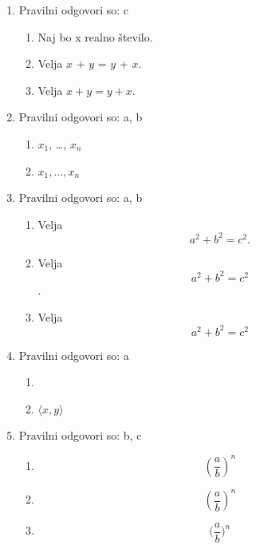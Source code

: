 \documentclass[11pt]{article}
\begin{document}
\begin{enumerate}
    \item Pravilni odgovori so: c%
    \begin{enumerate}
        \item Naj bo x realno število.
        \item Velja \(x\) + \(y\) = \(y\) + \(x\).
        \item Velja \(x + y = y + x\).
    \end{enumerate}

    \item Pravilni odgovori so:  a, b%
    \begin{enumerate}
        \item \(x_1\), \dots, \(x_n\)
        \item \(x_1, \ldots, x_n\)
    \end{enumerate}

    \item Pravilni odgovori so: a, b%
    \begin{enumerate}
        \item
Velja
\[
  a^2 + b^2 = c^2.
\]
        \item
Velja
\[
  a^2 + b^2 = c^2
\]
.
        \item
Velja
\[
  a^2 + b^2 = c^2
\]
    \end{enumerate}

    \item Pravilni odgovori so: a%
    \begin{enumerate}
        \item \(<x, y>\)
        \item \(\langle x, y \rangle\)
    \end{enumerate}

    \item Pravilni odgovori so: b, c %
    \begin{enumerate}
        \item \[ (\frac{a}{b})^n \]
        \item \[ \left(\frac{a}{b}\right)^n \]
        \item \[ \Big(\frac{a}{b}\Big)^n \]
    \end{enumerate}


\end{enumerate}
\end{document}
